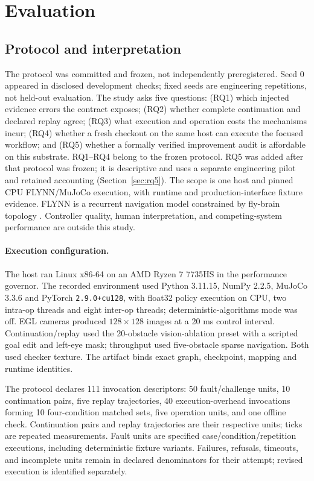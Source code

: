 \documentclass[10pt]{article}
\begin{document}
\section{Evaluation}
\label{sec:evaluation}
\subsection{Protocol and interpretation}
The protocol was committed and frozen, not independently preregistered. Seed 0
appeared in disclosed development checks; fixed seeds are engineering repetitions,
not held-out evaluation. The study asks five questions: (RQ1) which injected evidence errors the
contract exposes; (RQ2) whether complete continuation and declared replay agree;
(RQ3) what execution and operation costs the mechanisms incur; (RQ4) whether
a fresh checkout on the same host can execute the focused workflow; and (RQ5)
whether a formally verified improvement audit is affordable on this substrate.
RQ1--RQ4 belong to the frozen protocol. RQ5 was added after that protocol was
frozen; it is descriptive and uses a separate engineering pilot and retained
accounting (Section~\ref{sec:rq5}).
The scope is one host and pinned CPU FLYNN/MuJoCo execution, with runtime and
production-interface fixture evidence. FLYNN is a recurrent navigation model
constrained by fly-brain topology \citep{wang2026flynn}. Controller quality, human
interpretation, and competing-system performance are outside this study.

\paragraph{Execution configuration.}
The host ran Linux x86-64 on an AMD Ryzen 7 7735HS in the performance governor.
The recorded environment used Python 3.11.15, NumPy 2.2.5, MuJoCo 3.3.6 and
PyTorch \texttt{2.9.0+cu128}, with float32 policy execution on CPU, two intra-op
threads and eight inter-op threads; deterministic-algorithms mode was off.
EGL cameras produced $128\times128$ images at a 20 ms control interval.
Continuation/replay used the 20-obstacle vision-ablation preset with a scripted
goal edit and left-eye mask; throughput used five-obstacle sparse navigation.
Both used checker texture. The artifact binds exact graph, checkpoint, mapping
and runtime identities.

The protocol declares 111 invocation descriptors: 50 fault/challenge units,
10 continuation pairs, five replay trajectories, 40 execution-overhead
invocations forming 10 four-condition matched sets, five operation units, and
one offline check. Continuation pairs and replay trajectories are their
respective units; ticks are repeated measurements. Fault units are
specified case/condition/repetition executions, including deterministic fixture
variants. Failures, refusals, timeouts, and incomplete units remain in declared
denominators for their attempt; revised execution is identified separately.
\end{document}

